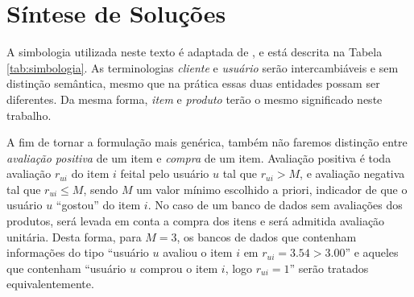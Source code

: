 \chapter[Síntese de Soluções]{Síntese de Soluções}
\label{chap:sintese_de_solucoes}

A simbologia utilizada neste texto é adaptada de \cite{symeonidis2007feature}, e está descrita na Tabela \ref{tab:simbologia}. As terminologias \textit{cliente} e \textit{usuário} serão intercambiáveis e sem distinção semântica, mesmo que na prática essas duas entidades possam ser diferentes. Da mesma forma, \textit{item} e \textit{produto} terão o mesmo significado neste trabalho. 

A fim de tornar a formulação mais genérica, também não faremos distinção entre \textit{avaliação positiva} de um item e \textit{compra} de um item. Avaliação positiva é toda avaliação $r_{ui}$ do item $i$ feital pelo usuário $u$ tal que $r_{ui} > M$, e avaliação negativa tal que $r_{ui} \leq M$, sendo $M$ um valor mínimo escolhido a priori, indicador de que o usuário $u$ ``gostou'' do item $i$. No caso de um banco de dados sem avaliações dos produtos, será levada em conta a compra dos itens e será admitida avaliação unitária. Desta forma, para $M=3$, os bancos de dados que contenham informações do tipo ``usuário $u$ avaliou o item $i$ em $r_{ui} = 3.54 > 3.00$'' e aqueles que contenham ``usuário $u$ comprou o item $i$, logo $r_{ui} = 1$'' serão tratados equivalentemente.

